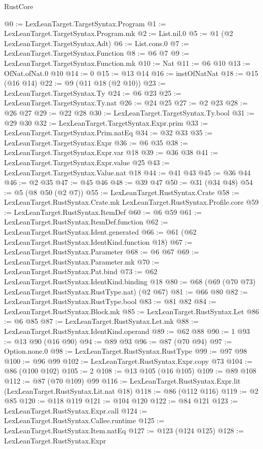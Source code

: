 \begin{lexlean}{RustCore}
\begin{coremodule}
@0 := LexLeanTarget.TargetSyntax.Program
@1 := LexLeanTarget.TargetSyntax.Program.mk
@2 := List.nil.{0}
@5 := @1 (@2 LexLeanTarget.TargetSyntax.Adt)
@6 := List.cons.{0}
@7 := LexLeanTarget.TargetSyntax.Function
@8 := @6 @7
@9 := LexLeanTarget.TargetSyntax.Function.mk
@10 := Nat
@11 := @6 @10
@13 := OfNat.ofNat.{0} @10
@14 := 0
@15 := @13 @14
@16 := instOfNatNat
@18 := @15 (@16 @14)
@22 := @9 (@11 @18 (@2 @10))
@23 := LexLeanTarget.TargetSyntax.Ty
@24 := @6 @23
@25 := LexLeanTarget.TargetSyntax.Ty.nat
@26 := @24 @25
@27 := @2 @23
@28 := @26 @27
@29 := @22 @28
@30 := LexLeanTarget.TargetSyntax.Ty.bool
@31 := @29 @30
@32 := LexLeanTarget.TargetSyntax.Expr.prim
@33 := LexLeanTarget.TargetSyntax.Prim.natEq
@34 := @32 @33
@35 := LexLeanTarget.TargetSyntax.Expr
@36 := @6 @35
@38 := LexLeanTarget.TargetSyntax.Expr.var @18
@39 := @36 @38
@41 := LexLeanTarget.TargetSyntax.Expr.value @25
@43 := LexLeanTarget.TargetSyntax.Value.nat @18
@44 := @41 @43
@45 := @36 @44
@46 := @2 @35
@47 := @45 @46
@48 := @39 @47
@50 := @31 (@34 @48)
@54 := @5 (@8 @50 (@2 @7))
@55 := LexLeanTarget.RustSyntax.Crate
@58 := LexLeanTarget.RustSyntax.Crate.mk LexLeanTarget.RustSyntax.Profile.core
@59 := LexLeanTarget.RustSyntax.ItemDef
@60 := @6 @59
@61 := LexLeanTarget.RustSyntax.ItemDef.function
@62 := LexLeanTarget.RustSyntax.Ident.generated
@66 := @61 (@62 LexLeanTarget.RustSyntax.IdentKind.function @18)
@67 := LexLeanTarget.RustSyntax.Parameter
@68 := @6 @67
@69 := LexLeanTarget.RustSyntax.Parameter.mk
@70 := LexLeanTarget.RustSyntax.Pat.bind
@73 := @62 LexLeanTarget.RustSyntax.IdentKind.binding @18
@80 := @68 (@69 (@70 @73) LexLeanTarget.RustSyntax.RustType.nat) (@2 @67)
@81 := @66 @80
@82 := LexLeanTarget.RustSyntax.RustType.bool
@83 := @81 @82
@84 := LexLeanTarget.RustSyntax.Block.mk
@85 := LexLeanTarget.RustSyntax.Let
@86 := @6 @85
@87 := LexLeanTarget.RustSyntax.Let.mk
@88 := LexLeanTarget.RustSyntax.IdentKind.operand
@89 := @62 @88
@90 := 1
@93 := @13 @90 (@16 @90)
@94 := @89 @93
@96 := @87 (@70 @94)
@97 := Option.none.{0}
@98 := LexLeanTarget.RustSyntax.RustType
@99 := @97 @98
@100 := @96 @99
@102 := LexLeanTarget.RustSyntax.Expr.copy @73
@104 := @86 (@100 @102)
@105 := 2
@108 := @13 @105 (@16 @105)
@109 := @89 @108
@112 := @87 (@70 @109) @99
@116 := LexLeanTarget.RustSyntax.Expr.lit (LexLeanTarget.RustSyntax.Lit.nat @18)
@118 := @86 (@112 @116)
@119 := @2 @85
@120 := @118 @119
@121 := @104 @120
@122 := @84 @121
@123 := LexLeanTarget.RustSyntax.Expr.call
@124 := LexLeanTarget.RustSyntax.Callee.runtime
@125 := LexLeanTarget.RustSyntax.Item.natEq
@127 := @123 (@124 @125)
@128 := LexLeanTarget.RustSyntax.Expr

\end{coremodule}
\end{lexlean}
